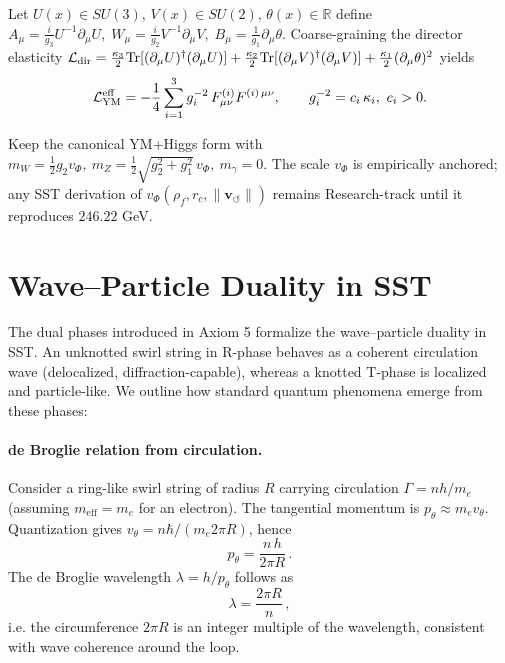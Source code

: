 \documentclass[11pt]{article}
\begin{document}
\begin{theorem}
	Let $U(x)\in SU(3),\,V(x)\in SU(2),\,\theta(x)\in\mathbb{R}$ define
	\(
	A_\mu=\frac{i}{g_3}U^{-1}\partial_\mu U,\;
	W_\mu=\frac{i}{g_2}V^{-1}\partial_\mu V,\;
	B_\mu=\frac{1}{g_1}\partial_\mu\theta.
	\)
	Coarse-graining the director elasticity
	\(
	\mathcal{L}_{\rm dir}=\tfrac{\kappa_3}{2}\mathrm{Tr}[(\partial_\mu U)^\dagger(\partial_\mu U)]
	+\tfrac{\kappa_2}{2}\mathrm{Tr}[(\partial_\mu V)^\dagger(\partial_\mu V)]
	+\tfrac{\kappa_1}{2}(\partial_\mu\theta)^2
	\)
	yields
	\[
		\mathcal{L}_{\rm YM}^{\rm eff}=-\frac{1}{4}\sum_{i=1}^3 g_i^{-2}\,F^{(i)}_{\mu\nu}F^{(i)\,\mu\nu},
		\qquad g_i^{-2}=c_i\,\kappa_i,\ c_i>0.
	\]
\end{theorem}

\begin{definition}
	Keep the canonical YM+Higgs form with $m_W=\tfrac{1}{2}g_2v_\Phi,\
	m_Z=\tfrac{1}{2}\sqrt{g_2^2+g_1^2}\,v_\Phi,\ m_\gamma=0$.
	The scale $v_\Phi$ is empirically anchored; any SST derivation of
	$v_\Phi(\rho_f,r_c,\|\mathbf{v}_{\!\boldsymbol{\circlearrowleft}}\|)$ remains Research-track until it reproduces $246.22$ GeV.
\end{definition}

\section{Wave–Particle Duality in SST}
\label{sec:wave_particle_duality}
The dual phases introduced in Axiom 5 formalize the wave–particle duality in SST. An unknotted swirl string in R-phase behaves as a coherent circulation wave (delocalized, diffraction-capable), whereas a knotted T-phase is localized and particle-like. We outline how standard quantum phenomena emerge from these phases:

\paragraph{de Broglie relation from circulation.}
    Consider a ring-like swirl string of radius $R$ carrying circulation $\Gamma = n h/m_e$ (assuming $m_{\text{eff}}=m_e$ for an electron). The tangential momentum is $p_\theta \approx m_e v_\theta$. Quantization gives $v_\theta = n \hbar/(m_e 2\pi R)$, hence
    \[
        p_\theta = \frac{n\,h}{2\pi R}\,.
    \]
    The de Broglie wavelength $\lambda = h/p_\theta$ follows as
    \[
        \lambda = \frac{2\pi R}{n}\,,
    \]
    i.e. the circumference $2\pi R$ is an integer multiple of the wavelength, consistent with wave coherence around the loop.
\end{document}
